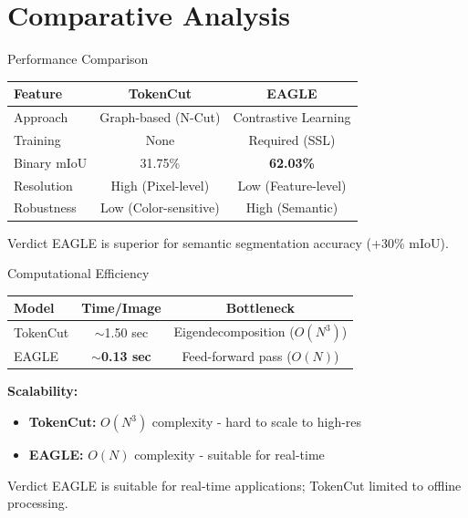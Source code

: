 \documentclass[aspectratio=169]{beamer}
\begin{document}
\section{Comparative Analysis}
\begin{frame}{Performance Comparison}
\begin{table}
\centering
\begin{tabular}{lcc}
\toprule
\textbf{Feature} & \textbf{TokenCut} & \textbf{EAGLE} \\
\midrule
Approach & Graph-based (N-Cut) & Contrastive Learning \\
Training & None & Required (SSL) \\
Binary mIoU & 31.75\% & \textbf{62.03\%} \\
Resolution & High (Pixel-level) & Low (Feature-level) \\
Robustness & Low (Color-sensitive) & High (Semantic) \\
\bottomrule
\end{tabular}
\end{table}
\vspace{0.5cm}
\begin{alertblock}{Verdict}
EAGLE is superior for semantic segmentation accuracy (+30\% mIoU).
\end{alertblock}
\end{frame}
\begin{frame}{Computational Efficiency}
\begin{table}
\centering
\begin{tabular}{lcc}
\toprule
\textbf{Model} & \textbf{Time/Image} & \textbf{Bottleneck} \\
\midrule
TokenCut & $\sim$1.50 sec & Eigendecomposition ($O(N^3)$) \\
EAGLE & \textbf{$\sim$0.13 sec} & Feed-forward pass ($O(N)$) \\
\bottomrule
\end{tabular}
\end{table}
\vspace{0.5cm}
\textbf{Scalability:}
\begin{itemize}
    \item \textbf{TokenCut:} $O(N^3)$ complexity - hard to scale to high-res
    \item \textbf{EAGLE:} $O(N)$ complexity - suitable for real-time
\end{itemize}
\vspace{0.3cm}
\begin{block}{Verdict}
EAGLE is suitable for real-time applications; TokenCut limited to offline processing.
\end{block}
\end{frame}
\end{document}
